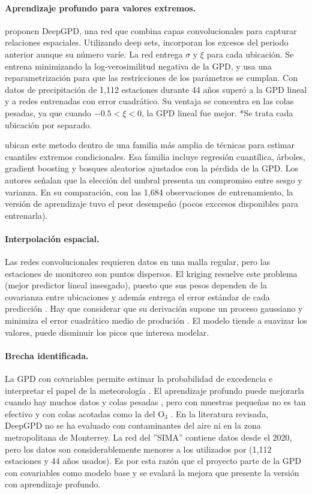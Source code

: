 \documentclass[11pt]{article}
\begin{document}
\paragraph{Aprendizaje profundo para valores extremos.}
\citet{wilson2022deepgpd} proponen DeepGPD, una red que combina capas convolucionales para capturar relaciones espaciales. Utilizando deep sets, incorporan los excesos del periodo anterior aunque su número varíe. La red entrega $\sigma$ y $\xi$ para cada ubicación. Se entrena minimizando la log-verosimilitud negativa de la GPD, y usa una reparametrización para que las restricciones de los parámetros se cumplan. Con datos de precipitación de 1{,}112 estaciones durante 44 años superó a la GPD lineal y a redes entrenadas con error cuadrático. Su ventaja se concentra en las colas pesadas, ya que cuando $-0.5 < \xi < 0$, la GPD lineal fue mejor. *Se trata cada ubicación por separado. 

\citet{tang2026} ubican este metodo dentro de una familia más amplia de técnicas para estimar cuantiles extremos condicionales. Esa familia incluye regresión cuantílica, árboles, gradient boosting y bosques aleatorios ajustados con la pérdida de la GPD. Los autores señalan que la elección del umbral presenta un compromiso entre sesgo y varianza. En su comparación, con las 1{,}684 observaciones de entrenamiento, la versión de aprendizaje tuvo el peor desempeño (pocos exccesos disponibles para entrenarla). 

\paragraph{Interpolación espacial.}
Las redes convolucionales requieren datos en una malla regular, pero las estaciones de monitoreo son puntos dispersos. El kriging resuelve este problema (mejor predictor lineal insesgado), puesto que sus pesos dependen de la covarianza entre ubicaciones y además entrega el error estándar de cada predicción \citep{wikle2019}. Hay que considerar que su derivación supone un proceso gaussiano y minimiza el error cuadrático medio de produción \citep{wikle2019}. El modelo tiende a suavizar los valores, puede disminuir los picos que interesa modelar.

\paragraph{Brecha identificada.}
La GPD con covariables permite estimar la probabilidad de excedencia e interpretar el papel de la meteorología \citep{gyarmati2017}. El aprendizaje profundo puede mejorarla cuando hay muchos datos y colas pesadas \citep{wilson2022deepgpd}, pero con muestras pequeñas no es tan efectivo \citep{tang2026} y con colas acotadas como la del O$_3$ \citep{gyarmati2017,wilson2022deepgpd}. En la literatura revisada, DeepGPD no se ha evaluado con contaminantes del aire ni en la zona metropolitana de Monterrey. La red del ''SIMA'' contiene datos desde el 2020, pero los datos son considerablemente menores a los utilizados por \citet{wilson2022deepgpd} (1{,}112 estaciones y 44 años usados). Es por esta razón que el proyecto parte de la GPD con covariables como modelo base y se evalará la mejora que presente la versión con aprendizaje profundo. 
\end{document}
